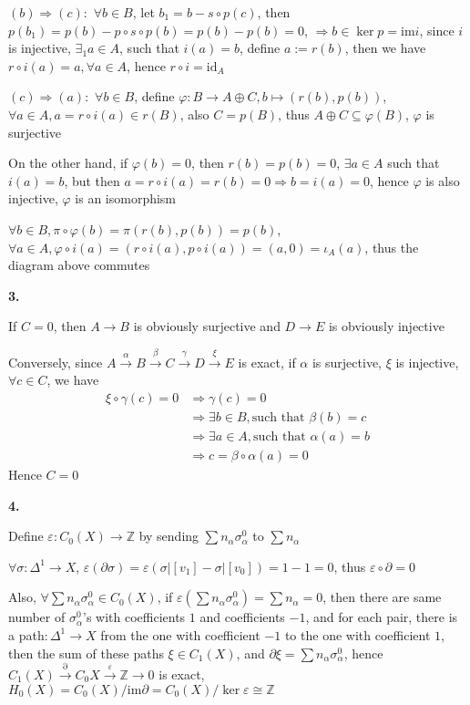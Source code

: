 \documentclass[../main.tex]{subfiles}
\begin{document}
$(b)\Rightarrow (c):$ $\forall b\in B$, let $b_1=b-s\circ p(c)$, then $p(b_1)=p(b)-p\circ s\circ p(b)=p(b)-p(b)=0$, $\Rightarrow b\in\ker p=\mathrm{im} i$, since $i$ is injective, $\exists_1 a\in A$, such that $i(a)=b$, define $a:=r(b)$, then we have $r\circ i(a)=a, \forall a\in A$, hence $r\circ i=\mathrm{id}_A$ \par
$(c)\Rightarrow (a):$ $\forall b\in B$, define $\varphi: B\rightarrow A\oplus C, b\mapsto (r(b),p(b))$, $\forall a\in A, a=r\circ i(a)\in r(B)$, also $C=p(B)$, thus $A\oplus C\subseteq\varphi(B)$, $\varphi$ is surjective \par
On the other hand, if $\varphi(b)=0$, then $r(b)=p(b)=0$, $\exists a\in A$ such that $i(a)=b$, but then $a=r\circ i(a)=r(b)=0\Rightarrow b=i(a)=0$, hence $\varphi$ is also injective, $\varphi$ is an isomorphism \par
$\forall b\in B, \pi\circ\varphi(b)=\pi(r(b),p(b))=p(b)$, $\forall a\in A, \varphi\circ i(a)=(r\circ i(a),p\circ i(a))=(a,0)=\iota_A(a)$, thus the diagram above commutes \par
\textbf{3.} \par
If $C=0$, then $A\rightarrow B$ is obviously surjective and $D\rightarrow E$ is obviously injective \par
Conversely, since $A\xrightarrow{\alpha}B\xrightarrow{\beta}C\xrightarrow{\gamma}D\xrightarrow{\xi}E$ is exact, if $\alpha$ is surjective, $\xi$ is injective, $\forall c\in C$, we have 
\[
\begin{aligned}
\xi\circ\gamma(c)=0
&\Rightarrow \gamma(c)=0 \\
&\Rightarrow \exists b\in B, \text{such that } \beta(b)=c \\
&\Rightarrow \exists a\in A, \text{such that } \alpha(a)=b \\
&\Rightarrow c=\beta\circ\alpha(a)=0
\end{aligned}
\]
Hence $C=0$ \par
\textbf{4.} \par
Define $\varepsilon: C_0(X)\rightarrow \mathbb{Z}$ by sending $\sum n_\alpha\sigma^0_\alpha$ to $\sum n_\alpha$ \par
$\forall \sigma: \Delta^1\rightarrow X$, $\varepsilon(\partial\sigma)=\varepsilon\left(\sigma|[v_1]-\sigma|[v_0]\right)=1-1=0$, thus $\varepsilon\circ\partial=0$ \par
Also, $\forall \sum n_\alpha\sigma^0_\alpha\in C_0(X)$, if $\varepsilon(\sum n_\alpha\sigma^0_\alpha)=\sum n_\alpha=0$, then there are same number of $\sigma^0_\alpha$'s with coefficients $1$ and coefficients $-1$, and for each pair, there is a path$: \Delta^1\rightarrow X$ from the one with coefficient $-1$ to the one with coefficient $1$, then the sum of these paths $\xi\in C_1(X)$, and $\partial\xi=\sum n_\alpha\sigma^0_\alpha$, hence $C_1(X)\xrightarrow{\partial}C_0{X}\xrightarrow{\varepsilon}\mathbb{Z}\rightarrow 0$ is exact, $H_0(X)=C_0(X)/\mathrm{im}\partial=C_0(X)/\ker\varepsilon\cong\mathbb{Z}$ \par
\end{document}
